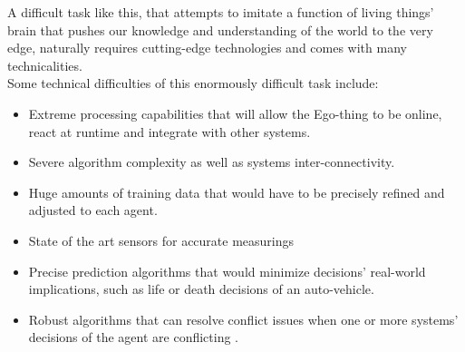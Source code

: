 \documentclass{amsbook}
\begin{document}
{A difficult task like this, that attempts to imitate a function of living things' brain that pushes our knowledge and understanding of the world to the very edge, naturally requires cutting-edge technologies and comes with many technicalities. \\
Some technical difficulties of this enormously difficult task include:
\begin{itemize}
    \item Extreme processing capabilities that will allow the Ego-thing to be online, react at runtime and integrate with other systems.
    \item Severe algorithm complexity as well as systems inter-connectivity.
    \item Huge amounts of training data that would have to be precisely refined and adjusted to each agent.
    \item State of the art sensors for accurate measurings
    \item Precise prediction algorithms that would minimize decisions' real-world implications, such as life or death decisions of an auto-vehicle.
    \item Robust algorithms that can resolve conflict issues when one or more systems' decisions of the agent are conflicting .
\end{itemize}

}
\end{document}
